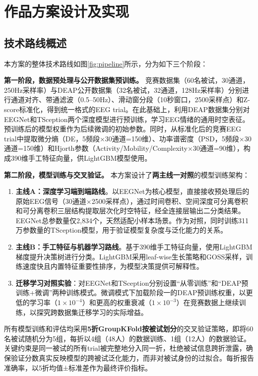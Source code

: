 \documentclass[UTF8,zihao=-4,fontset=windows]{ctexart}
\numberwithin{equation}{section}
\numberwithin{figure}{section}
\numberwithin{table}{section}
\begin{document}
\section{作品方案设计及实现}

\subsection{技术路线概述}

本方案的整体技术路线如图\ref{fig:pipeline}所示，分为如下三个阶段：

\textbf{第一阶段，数据预处理与公开数据集预训练。} 竞赛数据集（60名被试，30通道，250Hz采样率）与DEAP公开数据集（32名被试，32通道，128Hz采样率）分别进行通道对齐、带通滤波（0.5--50Hz）、滑动窗分段（10秒窗口，2500采样点）和Z-score标准化，得到统一格式的EEG trial。在此基础上，利用DEAP数据集分别对EEGNet和TSception两个深度模型进行预训练，学习EEG情绪的通用时空表征。预训练后的模型权重作为后续微调的初始参数。同时，从标准化后的竞赛EEG trial中提取微分熵（DE，5频段×30通道=150维）、功率谱密度（PSD，5频段×30通道=150维）和Hjorth参数（Activity/Mobility/Complexity×30通道=90维），构成390维手工特征向量，供LightGBM模型使用。

\textbf{第二阶段，模型训练与交叉验证。} 本方案设计了\textbf{两主线一对照}的模型训练架构：

\begin{enumerate}[label={(\arabic*)}, labelindent=2em, leftmargin=4.5em, itemindent=0pt, labelsep=0.5em]
    \item \textbf{主线A：深度学习端到端路线}。以EEGNet为核心模型，直接接收预处理后的原始EEG信号（30通道×2500采样点），通过时间卷积、空间深度可分离卷积和可分离卷积三层结构提取层次化时空特征，经全连接层输出二分类结果。EEGNet总参数量仅2,834个，天然适配小样本场景。作为对照，同时训练311万参数量的TSception模型，用于验证模型复杂度与泛化能力的关系。
    \item \textbf{主线B：手工特征与机器学习路线}。基于390维手工特征向量，使用LightGBM梯度提升决策树进行分类。LightGBM采用leaf-wise生长策略和GOSS采样，训练速度快且内置特征重要性排序，为模型决策提供可解释性。
    \item \textbf{迁移学习对照实验}：对EEGNet和TSception分别设置“从零训练”和“DEAP预训练+微调”两种训练模式。微调模式下加载阶段一的DEAP预训练权重，以更低的学习率（$1\times10^{-4}$）和更高的权重衰减（$1\times10^{-3}$）在竞赛数据上继续训练，以探究跨数据集迁移学习的实际增益。
\end{enumerate}

所有模型训练和评估均采用\textbf{5折GroupKFold按被试划分}的交叉验证策略，即将60名被试随机分为5组，每折以4组（48人）的数据训练、1组（12人）的数据验证。关键约束是同一被试的所有trial被完整地分入同一折，杜绝被试信息跨折泄露，确保验证分数真实反映模型的跨被试泛化能力，而非对被试身份的过拟合。每折报告准确率，以5折均值±标准差作为最终评价指标。
\end{document}
